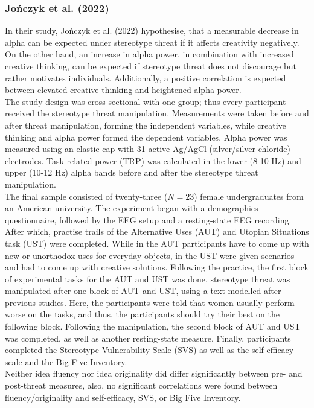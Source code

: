 \documentclass[
  stu,floatsintext]{apa7}
\begin{document}
\subsubsection{Jończyk et al. (2022)}\label{jonczykhowstereotypethreat2022}

In their study, Jończyk et al. (2022) hypothesise, that a measurable decrease in alpha can be expected under stereotype threat if it affects creativity negatively.
On the other hand, an increase in alpha power, in combination with increased creative thinking, can be expected if stereotype threat does not discourage but rather motivates individuals.
Additionally, a positive correlation is expected between elevated creative thinking and heightened alpha power.\\
The study design was cross-sectional with one group; thus every participant received the stereotype threat manipulation.
Measurements were taken before and after threat manipulation, forming the independent variables, while creative thinking and alpha power formed the dependent variables.
Alpha power was measured using an elastic cap with 31 active Ag/AgCl (silver/silver chloride) electrodes.
Task related power (TRP) was calculated in the lower (8-10 Hz) and upper (10-12 Hz) alpha bands before and after the stereotype threat manipulation.\\
The final sample consisted of twenty-three (\(N = 23\)) female undergraduates from an American university.
The experiment began with a demographics questionnaire, followed by the EEG setup and a resting-state EEG recording.
After which, practise trails of the Alternative Uses (AUT) and Utopian Situations task (UST) were completed.
While in the AUT participants have to come up with new or unorthodox uses for everyday objects, in the UST were given scenarios and had to come up with creative solutions.
Following the practice, the first block of experimental tasks for the AUT and UST was done, stereotype threat was manipulated after one block of AUT and UST, using a text modelled after previous studies.
Here, the participants were told that women usually perform worse on the tasks, and thus, the participants should try their best on the following block.
Following the manipulation, the second block of AUT and UST was completed, as well as another resting-state measure.
Finally, participants completed the Stereotype Vulnerability Scale (SVS) as well as the self-efficacy scale and the Big Five Inventory.\\
Neither idea fluency nor idea originality did differ significantly between pre- and post-threat measures, also, no significant correlations were found between fluency/originality and self-efficacy, SVS, or Big Five Inventory.
\end{document}

